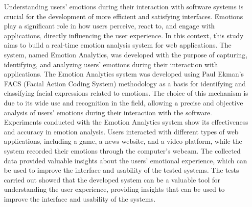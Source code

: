 \begin{resumo-ingles}

  \noindent Understanding users' emotions during their interaction with software systems is crucial for the development of more efficient and satisfying interfaces. Emotions play a significant role in how users perceive, react to, and engage with applications, directly influencing the user experience. In this context, this study aims to build a real-time emotion analysis system for web applications. The system, named Emotion Analytics, was developed with the purpose of capturing, identifying, and analyzing users' emotions during their interaction with applications. The Emotion Analytics system was developed using Paul Ekman's FACS (Facial Action Coding System) methodology as a basis for identifying and classifying facial expressions related to emotions. The choice of this mechanism is due to its wide use and recognition in the field, allowing a precise and objective analysis of users' emotions during their interaction with the software. Experiments conducted with the Emotion Analytics system show its effectiveness and accuracy in emotion analysis. Users interacted with different types of web applications, including a game, a news website, and a video platform, while the system recorded their emotions through the computer's webcam. The collected data provided valuable insights about the users' emotional experience, which can be used to improve the interface and usability of the tested systems. The tests carried out showed that the developed system can be a valuable tool for understanding the user experience, providing insights that can be used to improve the interface and usability of the systems.


\end{resumo-ingles}
